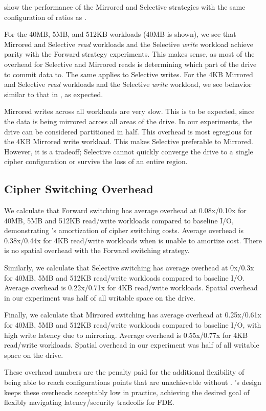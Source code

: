 show the performance of the Mirrored and
Selective strategies with the same configuration of ratios as
.

For the 40MB, 5MB, and 512KB workloads (40MB is shown), we see that Mirrored and
Selective \emph{read} workloads and the Selective \emph{write} workload achieve
parity with the Forward strategy experiments. This makes sense, as most of the
overhead for Selective and Mirrored reads is determining which part of the drive
to commit data to. The same applies to Selective writes. For the 4KB Mirrored
and Selective \emph{read} workloads and the Selective \emph{write} workload, we
see behavior similar to that in , as expected.

Mirrored writes across all workloads are very slow. This is to be expected,
since the data is being mirrored across all areas of the drive. In our
experiments, the drive can be considered partitioned in half. This overhead is
most egregious for the 4KB Mirrored write workload. This makes Selective
preferable to Mirrored. However, it is a tradeoff; Selective cannot quickly
converge the drive to a single cipher configuration or survive the loss of an
entire region.

\subsection{Cipher Switching Overhead} \label{subsec:3}

We calculate that Forward switching has average overhead at 0.08x/0.10x for
40MB, 5MB and 512KB read/write workloads compared to baseline I/O, demonstrating
\sys{}'s amortization of cipher switching costs. Average overhead
is\\0.38x/0.44x for 4KB read/write workloads when \sys{} is unable to
amortize cost. There is no spatial overhead with the Forward switching strategy.

Similarly, we calculate that Selective switching has average overhead at 0x/0.3x
for 40MB, 5MB and 512KB read/write workloads compared to baseline I/O. Average
overhead is 0.22x/0.71x for 4KB read/write workloads. Spatial overhead in our
experiment was half of all writable space on the drive.

Finally, we calculate that Mirrored switching has average overhead at
0.25x/0.61x for 40MB, 5MB and 512KB read/write workloads compared to baseline
I/O, with high write latency due to mirroring. Average overhead is 0.55x/0.77x
for 4KB read/write workloads. Spatial overhead in our experiment was half of all
writable space on the drive.

These overhead numbers are the penalty paid for the additional flexibility of
being able to reach configurations points that are unachievable without
\sys{}. \sys{}'s design keeps these overheads acceptably low in
practice, achieving the desired goal of flexibly navigating latency/security
tradeoffs for FDE.
